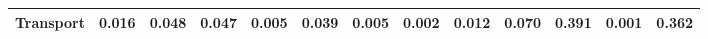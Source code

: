 \begin{table}[htbp]
\begin{tabular}{lcccccccccccc}
  Transport & \textcolor[RGB]{172,111,83}{0.016} & \textcolor[RGB]{97,63,158}{0.048} & \textcolor[RGB]{101,65,154}{0.047} & \textcolor[RGB]{205,133,50}{0.005} & \textcolor[RGB]{115,74,140}{0.039} & \textcolor[RGB]{207,134,48}{0.005} & \textcolor[RGB]{234,151,21}{0.002} & \textcolor[RGB]{191,124,64}{0.012} & \textcolor[RGB]{66,42,189}{0.070} & \textcolor[RGB]{7,5,248}{0.391} & \textcolor[RGB]{251,163,4}{0.001} & \textcolor[RGB]{14,9,241}{0.362} \\ 
   \hline
\end{tabular}
\end{table}

